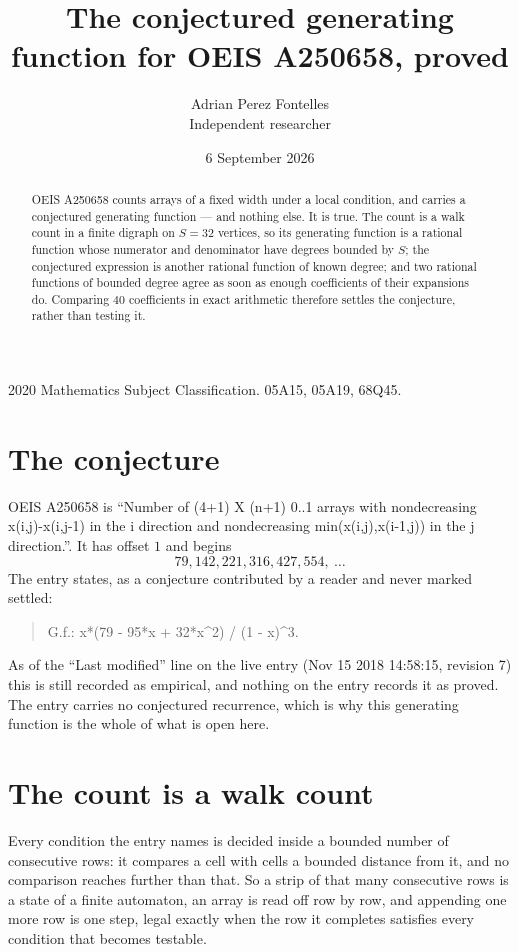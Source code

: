 \documentclass[11pt,a4paper]{article}
\title{The conjectured generating function for OEIS A250658, proved}
\author{Adrian Perez Fontelles\\ \small Independent researcher}
\date{6 September 2026}
\theoremstyle{plain}
\theoremstyle{definition}
\begin{document}
\maketitle

\begin{abstract}
OEIS A250658 counts arrays of a fixed width under a local condition, and carries a conjectured
generating function --- and nothing else. It is true. The count is a walk count in a finite
digraph on $S=32$ vertices, so its generating function is a rational function whose numerator
and denominator have degrees bounded by $S$; the conjectured expression is another rational
function of known degree; and two rational functions of bounded degree agree as soon as enough
coefficients of their expansions do. Comparing $40$ coefficients in exact arithmetic
therefore settles the conjecture, rather than testing it.
\end{abstract}

\noindent\small 2020 Mathematics Subject Classification. 05A15, 05A19, 68Q45.\normalsize

\section{The conjecture}

OEIS A250658 is ``Number of (4+1) X (n+1) 0..1 arrays with nondecreasing x(i,j)-x(i,j-1) in the i direction and nondecreasing min(x(i,j),x(i-1,j)) in the j direction.''. It has offset $1$ and begins
\[
79, 142, 221, 316, 427, 554,\ \dots
\]
The entry states, as a conjecture contributed by a reader and never marked settled:
\begin{quote}
G.f.: x*(79 - 95*x + 32*x\^{}2) / (1 - x)\^{}3.
\end{quote}
As of the ``Last modified'' line on the live entry (Nov 15 2018 14:58:15, revision 7) this is still
recorded as empirical, and nothing on the entry records it as proved. The entry carries no
conjectured recurrence, which is why this generating function is the whole of what is open
here.

\section{The count is a walk count}

Every condition the entry names is decided inside a bounded number of consecutive rows: it
compares a cell with cells a bounded distance from it, and no comparison reaches further than
that. So a strip of that many consecutive rows is a state of a finite automaton, an array is
read off row by row, and appending one more row is one step, legal exactly when the row it
completes satisfies every condition that becomes testable.
\end{document}
